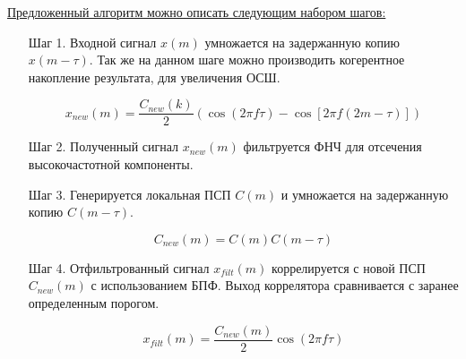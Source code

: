 {\underline{Предложенный алгоритм можно описать следующим набором шагов:}}
\begin{itemize}
\item[Шаг 1.] Входной сигнал ${x(m)}$ умножается на задержанную копию ${x(m-\tau)}$. Так же
	на данном шаге можно производить когерентное накопление результата, для
	увеличения ОСШ.

	\begin{center}
	\begin{equation}
		x_{new}(m) = \frac{C_{new}(k)}{2} \left(\cos (2\pi f \tau) - \cos \left[2 \pi f (2m - \tau)\right]\right)
	\end{equation}
	\end{center}

\item[Шаг 2.] Полученный сигнал ${x_{new}(m)}$ фильтруется ФНЧ для отсечения высокочастотной компоненты.
\item[Шаг 3.] Генерируется локальная ПСП ${C(m)}$ и умножается на задержанную копию ${C(m-\tau)}$.

	\begin{center}
	\begin{equation}
		C_{new}(m) = C(m)C(m-\tau)
	\end{equation}
	\end{center}

\item[Шаг 4.] Отфильтрованный сигнал ${x_{filt}(m)}$ коррелируется с новой ПСП ${C_{new}(m)}$
	с использованием БПФ. Выход коррелятора сравнивается с заранее определенным порогом.

	\begin{center}
	\begin{equation}
		x_{filt}(m) = \frac{C_{new}(m)}{2} \cos (2\pi f \tau)
	\end{equation}
	\end{center}


\end{itemize}

